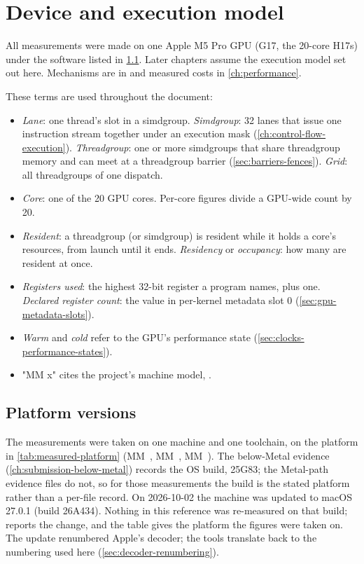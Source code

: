 \chapter{Device and execution model}\label{ch:device-execution-model}

All measurements were made on one Apple M5 Pro GPU (G17, the 20-core H17s) under the software listed in
\cref{sec:measured-part-software}. Later chapters assume the execution model set out here. Mechanisms are in  and measured costs in \cref{ch:performance}.

These terms are used throughout the document:

\begin{itemize}
\item \emph{Lane}: one thread's slot in a simdgroup. \emph{Simdgroup}: 32 lanes that issue one instruction stream together under an
  execution mask (\cref{ch:control-flow-execution}). \emph{Threadgroup}: one or more simdgroups that share threadgroup memory and can meet at a
  threadgroup barrier (\cref{sec:barriers-fences}). \emph{Grid}: all threadgroups of one dispatch.
\item \emph{Core}: one of the 20 GPU cores. Per-core figures divide a GPU-wide count by 20.
\item \emph{Resident}: a threadgroup (or simdgroup) is resident while it holds a core's resources, from launch until it ends.
  \emph{Residency} or \emph{occupancy}: how many are resident at once.
\item \emph{Registers used}: the highest 32-bit register a program names, plus one. \emph{Declared register count}: the value in
  per-kernel metadata slot 0 (\cref{sec:gpu-metadata-slots}).
\item \emph{Warm} and \emph{cold} refer to the GPU's performance state (\cref{sec:clocks-performance-states}).
\item "MM x" cites the project's machine model, .
\end{itemize}

\section{Platform versions}\label{sec:measured-part-software}

The measurements were taken on one machine and one toolchain, on the platform in \cref{tab:measured-platform} (MM~, MM~,
MM~). The below-Metal evidence (\cref{ch:submission-below-metal}) records the OS build, 25G83; the Metal-path
evidence files do not, so for those measurements the build is the stated platform rather than a per-file record.
On 2026-10-02 the machine was updated to macOS 27.0.1 (build 26A434). Nothing in this reference was re-measured on that
build;  reports the change, and the table gives the platform the figures were taken on.
The update renumbered Apple's decoder; the tools translate back to the numbering used here (\cref{sec:decoder-renumbering}).

